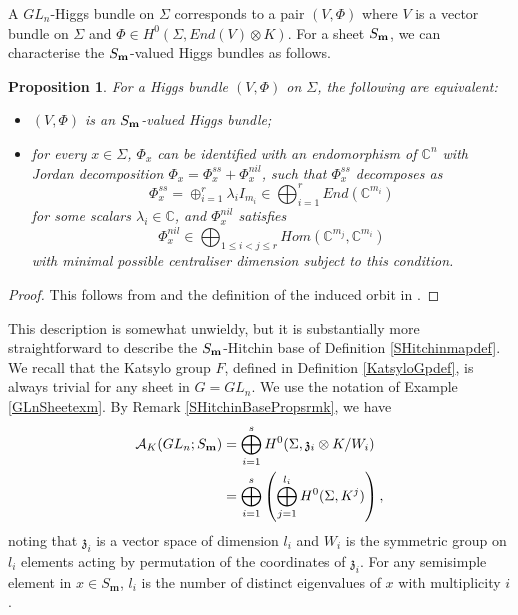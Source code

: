 \documentclass{amsart}
\newtheorem{proposition}[theorem]{Proposition}
\theoremstyle{remark}
\numberwithin{theorem}{section}
\numberwithin{equation}{section}
\begin{document}
A $GL_n$-Higgs bundle on $\Sigma$ corresponds to a pair $(V,\Phi)$ where $V$ is a vector bundle on $\Sigma$ and $\Phi \in H^0(\Sigma,End(V)\otimes K)$. For a sheet $S_{\bf m}$, we can characterise the $S_{\bf m}$-valued Higgs bundles as follows. 

\begin{proposition}\label{SmValuedHiggsGLnprp}
    For a Higgs bundle $(V,\Phi)$ on $\Sigma$, the following are equivalent:
    \begin{itemize}
        \item[(i)] $(V,\Phi)$ is an $S_{\bf m}$-valued Higgs bundle;
        \item[(ii)] for every $x \in \Sigma$, $\Phi_x$ can be identified with an endomorphism of $\mathbb{C}^n$ with Jordan decomposition $\Phi_x = \Phi_x^{ss}+\Phi_x^{nil}$, such that $\Phi_x^{ss}$ decomposes as
        \begin{equation}\label{SmValuedHiggsGLn1eqn}
            \Phi_x^{ss} = \oplus_{i=1}^r\lambda_iI_{m_i} \in \bigoplus_{i=1}^r End(\mathbb{C}^{m_i})
        \end{equation}
        for some scalars $\lambda_i \in \mathbb{C}$, and $\Phi_x^{nil}$ satisfies 
        \begin{equation}\label{SmValuedHiggsGln2eqn}
            \Phi_x^{nil} \in \bigoplus_{1\leq i<j \leq r}Hom(\mathbb{C}^{m_j},\mathbb{C}^{m_i})
        \end{equation}
        with minimal possible centraliser dimension subject to this condition.

    \end{itemize}
\end{proposition}

\begin{proof}
This follows from \cite[Satz 4.8]{Borho2} and the definition of the induced orbit in \cite{LS}.
\end{proof}

This description is somewhat unwieldy, but it is substantially more straightforward to describe the $S_{\bf m}$-Hitchin base of Definition \ref{SHitchinmapdef}. We recall that the Katsylo group $F$, defined in Definition \ref{KatsyloGpdef}, is always trivial for any sheet in $G=GL_n$. We use the notation of Example \ref{GLnSheetexm}. By Remark \ref{SHitchinBasePropsrmk}, we have
\begin{equation}\label{SmHitchinBaseGLneqn}
\begin{aligned}
    \mathcal A_K(GL_n;S_{\bf m}) &= \bigoplus_{i=1}^sH^0(\Sigma,\mathfrak{z}_i \otimes  K/W_i) 
    \\
    &= \bigoplus_{i=1}^s\left(\bigoplus_{j=1}^{l_i}H^0(\Sigma,K^j) \right),
\end{aligned}
\end{equation}
noting that $\mathfrak{z}_i$ is a vector space of dimension $l_i$ and $W_i$ is the symmetric group on $l_i$ elements acting by permutation of the coordinates of $\mathfrak{z}_i$. For any semisimple element in $x \in S_{\textbf{m}}$, $l_i$ is the number of distinct eigenvalues of $x$ with multiplicity $i$.
\end{document}

